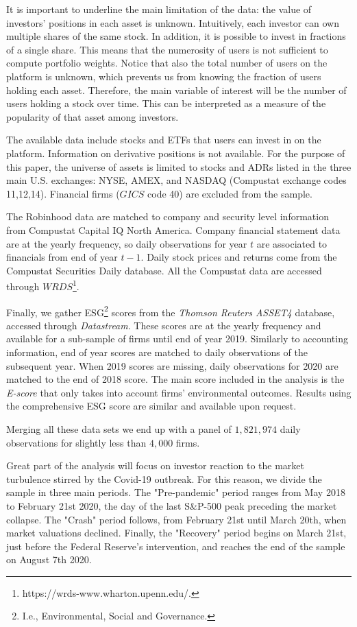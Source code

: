 \documentclass[12pt]{article}
\numberwithin{equation}{section} %
\begin{document}
It is important to underline the main limitation of the data: the value of investors' positions in each asset is unknown. Intuitively, each investor can own multiple shares of the same stock. In addition, it is possible to invest in fractions of a single share. This means that the numerosity of users is not sufficient to compute portfolio weights. Notice that also the total number of users on the platform is unknown, which prevents us from knowing the fraction of users holding each asset. Therefore, the main variable of interest will be the number of users holding a stock over time. This can be interpreted as a measure of the popularity of that asset among investors.

The available data include stocks and ETFs that users can invest in on the platform. Information on derivative positions is not available. For the purpose of this paper, the universe of assets is limited to stocks and ADRs listed in the three main U.S. exchanges: NYSE, AMEX, and NASDAQ (Compustat exchange codes 11,12,14). Financial firms ($GICS$ code 40) are excluded from the sample.

The Robinhood data are matched to company and security level information from Compustat Capital IQ North America. Company financial statement data are at the yearly frequency, so daily observations for year $t$ are associated to financials from end of year $t-1$. Daily stock prices and returns come from the Compustat Securities Daily database. All the Compustat data are accessed through $WRDS$\footnote{https://wrds-www.wharton.upenn.edu/.}.

Finally, we gather ESG\footnote{I.e., Environmental, Social and Governance.} scores from the \textit{Thomson Reuters ASSET4} database, accessed through \textit{Datastream}. These scores are at the yearly frequency and available for a sub-sample of firms until end of year 2019. Similarly to accounting information, end of year scores are matched to daily observations of the subsequent year. When 2019 scores are missing, daily observations for 2020 are matched to the end of 2018 score. The main score included in the analysis is the \textit{E-score} that only takes into account firms' environmental outcomes. Results using the comprehensive ESG score are similar and available upon request.  

Merging all these data sets we end up with a panel of $1,821,974$ daily observations for slightly less than $4,000$ firms.

Great part of the analysis will focus on investor reaction to the market turbulence stirred by the Covid-19 outbreak. For this reason, we divide the sample in three main periods. The "Pre-pandemic" period ranges from May 2018 to February 21st 2020, the day of the last S\&P-500 peak preceding the market collapse. The "Crash" period follows, from February 21st until March 20th, when market valuations declined. Finally, the "Recovery" period begins on March 21st, just before the Federal Reserve's intervention, and reaches the end of the sample on August 7th 2020.
\end{document}
